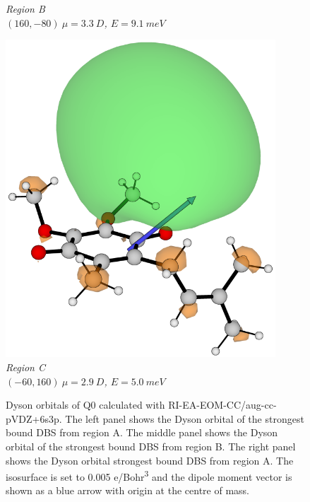\begin{figure}[h]
\begin{minipage}[b]{0.30\textwidth}
      \small\emph{Region B \\$(160,-80)~\mu=3.3~D$, $E=9.1~meV$}
  \end{minipage}
  \hfill
  \begin{minipage}[b]{0.30\textwidth}
    \centering
    \includegraphics[width=0.9\textwidth]{chapters/results/image/Q1_112.png}
    \small\emph{Region C \\$(-60,160)~\mu=2.9~D$, $E=5.0~meV$}
  \end{minipage}
  \caption[Dyson orbitals of Q1]{Dyson orbitals of Q0 calculated with RI-EA-EOM-CC/aug-cc-pVDZ+6s3p. The left panel shows the Dyson orbital of the strongest bound DBS from region A. The middle panel shows the Dyson orbital of the strongest bound DBS from region B. The right panel shows the Dyson orbital strongest bound DBS from region A. The isosurface is set to 0.005 e/Bohr\textsuperscript{3} and the dipole moment vector is shown as a blue arrow with origin at the centre of mass.}
  \label{fig:Q1_dyson}
\end{figure}

